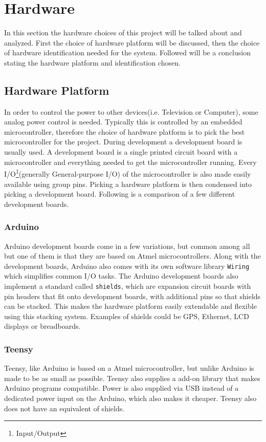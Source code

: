 \section{Hardware}
In this section the hardware choices of this project will be talked about and analyzed. First the choice of hardware platform will be discussed, then the choice of hardware identification needed for the system. Followed will be a conclusion stating the hardware platform and identification chosen.

\subsection{Hardware Platform}
In order to control the power to other devices(i.e. Television or Computer), some analog power control is needed. Typically this is controlled by an embedded microcontroller, therefore the choice of hardware platform is to pick the best microcontroller for the project. During development a development board is usually used. A development board is a single printed circuit board with a microcontroller and everything needed to get the microcontroller running. Every I/O\footnote{Input/Output}(generally General-purpose I/O) of the microcontroller is also made easily available using group pins. Picking a hardware platform is then condensed into picking a development board. Following is a comparison of a few different development boards.

\subsubsection{Arduino}
Arduino development boards come in a few variations, but common among all but one of them is that they are based on Atmel microcontrollers. Along with the development boards, Arduino also comes with its own software library \texttt{Wiring} which simplifies common I/O tasks. The Arduino development boards also implement a standard called \texttt{shields}, which are expansion circuit boards with pin headers that fit onto development boards, with additional pins so that shields can be stacked. This makes the hardware platform easily extendable and flexible using this stacking system. Examples of shields could be GPS, Ethernet, LCD displays or breadboards.


\subsubsection{Teensy}
Teensy, like Arduino is based on a Atmel microcontroller, but unlike Arduino is made to be as small as possible. Teensy also supplies a add-on library that makes Arduino programs compatible. Power is also supplied via USB instead of a dedicated power input on the Arduino, which also makes it cheaper. Teensy also does not have an equivalent of shields.


